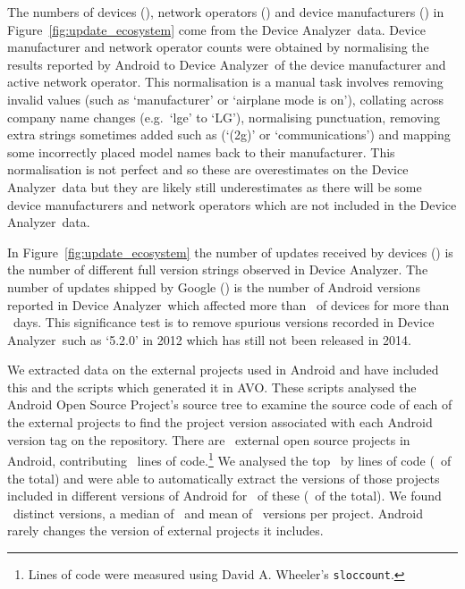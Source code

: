 \documentclass[conference,a4paper,twoside]{IEEEtran}
\newcommand{\da}{Device Analyzer}
\newcommand{\avo}{AVO}
\begin{document}
The numbers of devices (\daNumOSDevices), network operators (\daNumOperators) and device manufacturers (\daNumManufacturers) in Figure~\ref{fig:update_ecosystem} come from the \da\ data.
Device manufacturer and network operator counts were obtained by normalising the results reported by Android to \da\ of the device manufacturer and active network operator.
This normalisation is a manual task involves removing invalid values (such as `manufacturer' or `airplane mode is on'), collating across company name changes (e.g.\ `lge' to `LG'), normalising punctuation, removing extra strings sometimes added such as (`(2g)' or `communications') and mapping some incorrectly placed model names back to their manufacturer.
This normalisation is not perfect and so these are overestimates on the \da\ data but they are likely still underestimates as there will be some device manufacturers and network operators which are not included in the \da\ data.

In Figure~\ref{fig:update_ecosystem} the number of updates received by devices (\daNumFullVersions) is the number of different full version strings observed in \da.
The number of updates shipped by Google (\daNumSigOSVersions) is the number of Android versions reported in \da\ which affected more than \daSigVersionPerc\ of devices for more than \daSigVersionDays\ days.
This significance test is to remove spurious versions recorded in \da\ such as `5.2.0' in 2012 which has still not been released in 2014.

We extracted data on the external projects used in Android and have included this and the scripts which generated it in \avo.
These scripts analysed the Android Open Source Project's source tree to examine the source code of each of the external projects to find the project version associated with each Android version tag on the repository.
There are \avoNumExternalProjects\ external open source projects in Android, contributing \avoTotalExternalLines\ lines of code.\footnote{Lines of code were measured using David A. Wheeler's \texttt{sloccount}.}
We analysed the top \avoNumBigExternalProjects\ by lines of code (\avoBigExternalLinesOfCodePerc\ of the total) and were able to automatically extract the versions of those projects included in different versions of Android for \avoNumAnalysedExternalProjects\ of these (\avoAnalysedExternalLinesOfCodePerc\ of the total).
We found \avoBigExternalTotalVersions\ distinct versions, a median of \avoBigExternalMedianVersions\ and mean of \avoBigExternalMeanVersions\ versions per project.
Android rarely changes the version of external projects it includes.
\end{document}
